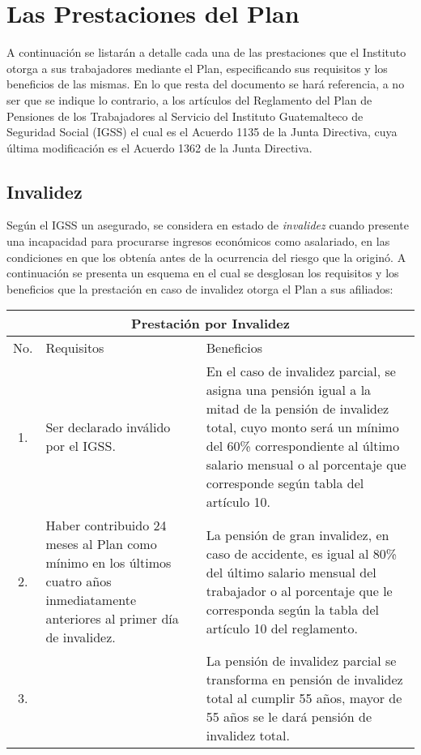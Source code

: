 \documentclass[12pt,letterpaper,titlepage]{article}
\begin{document}
{%
\newpage
\section{Las Prestaciones del Plan}

A continuación se listarán a detalle cada una de las prestaciones que el Instituto otorga a sus trabajadores mediante el Plan, especificando sus requisitos y los beneficios de las mismas. En lo que resta del documento se hará referencia, a no ser que se indique lo contrario, a los artículos del Reglamento del Plan de Pensiones de los Trabajadores al Servicio del Instituto Guatemalteco de Seguridad Social (IGSS) el cual es el Acuerdo 1135 de la Junta Directiva, cuya última modificación es el Acuerdo 1362 de la Junta Directiva.

\subsection{Invalidez}

Según el IGSS un asegurado, se considera en estado de \textit{invalidez} cuando presente una incapacidad para procurarse ingresos económicos como asalariado, en las condiciones en que los obtenía antes de la ocurrencia del riesgo que la originó. A continuación se presenta un esquema en el cual se desglosan los requisitos y los beneficios que la prestación en caso de invalidez otorga el Plan a sus afiliados:

\begin{center}
	\begin{tabular}{|c||p{5cm}||p{7cm}|}
	\hline 
	\multicolumn{3}{|c|}{Prestación por Invalidez} \\ 
	\hline 
	\hline 
	No. & Requisitos & Beneficios \\ 
	\cline {1-1}
	\cline {2-2}
	\cline {3-3}
	1. & Ser declarado inválido por el IGSS. &   En el caso de invalidez parcial, se asigna una pensión igual a la mitad de la pensión de invalidez total, cuyo monto será un mínimo del 60\% correspondiente al último salario mensual o al porcentaje que corresponde según tabla del artículo 10.\\ 
	\hline 
	2. &  Haber contribuido 24 meses al Plan como mínimo en los últimos cuatro años inmediatamente anteriores al primer día de invalidez. & La pensión de gran invalidez, en caso de accidente, es igual al 80\% del último salario mensual del trabajador o al porcentaje que le corresponda según la tabla del artículo 10 del reglamento. \\ 
	\hline 
	3. & & La pensión de invalidez parcial se transforma en pensión de invalidez total al cumplir 55 años, mayor de 55 años se le dará pensión de invalidez total.\\
	\hline
\end{tabular} 
\end{center}

}
\end{document}
